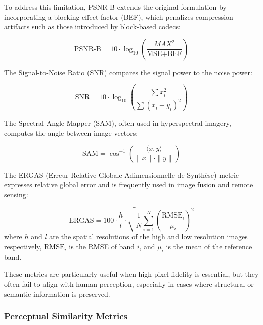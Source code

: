 To address this limitation, PSNR-B extends the original formulation by incorporating a blocking effect factor (BEF), which penalizes compression artifacts such as those introduced by block-based codecs:

\begin{equation}
\text{PSNR-B} = 10 \cdot \log_{10} \left( \frac{MAX^2}{\text{MSE} + \text{BEF}} \right)
\end{equation}

The Signal-to-Noise Ratio (SNR) compares the signal power to the noise power:

\begin{equation}
\text{SNR} = 10 \cdot \log_{10} \left( \frac{\sum x_i^2}{\sum {(x_i - y_i)}^2} \right)
\end{equation}

The Spectral Angle Mapper (SAM), often used in hyperspectral imagery, computes the angle between image vectors:

\begin{equation}
\text{SAM} = \cos^{-1} \left( \frac{\langle x, y \rangle}{\|x\| \cdot \|y\|} \right)
\end{equation}

The ERGAS (Erreur Relative Globale Adimensionnelle de Synthèse) metric expresses relative global error and is frequently used in image fusion and remote sensing:

\begin{equation}
\text{ERGAS} = 100 \cdot \frac{h}{l} \cdot \sqrt{ \frac{1}{N} \sum_{i=1}^{N} {\left( \frac{\text{RMSE}_i}{\mu_i} \right)}^2 }
\end{equation}
where $h$ and $l$ are the spatial resolutions of the high and low resolution images respectively, $\text{RMSE}_i$ is the RMSE of band $i$, and $\mu_i$ is the mean of the reference band.

These metrics are particularly useful when high pixel fidelity is essential, but they often fail to align with human perception, especially in cases where structural or semantic information is preserved.


\subsubsection{Perceptual Similarity Metrics}\label{sec:perceptual_metrics}

